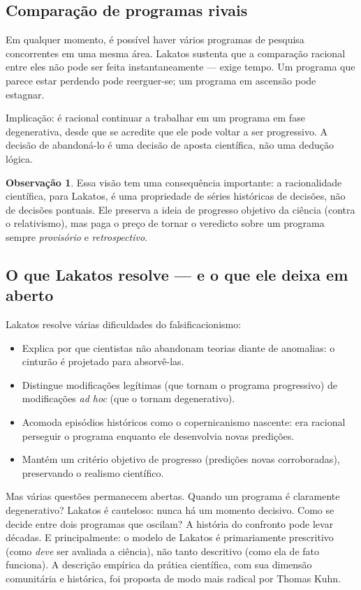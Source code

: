 \documentclass[9pt,a4paper]{extarticle}
\newcommand{\impt}[1]{\textcolor{important}{#1}}
\newcommand{\ntc}[1]{\textcolor{notice}{#1}}
\theoremstyle{definition}
\newtheorem{remark}{Observação}[section]
\begin{document}
\subsection{Comparação de programas rivais}

Em qualquer momento, é possível haver vários programas de pesquisa concorrentes em uma mesma área. Lakatos sustenta que a comparação racional entre eles \impt{não pode ser feita instantaneamente} --- exige tempo. Um programa que parece estar perdendo pode reerguer-se; um programa em ascensão pode estagnar.

\ntc{Implicação:} é \impt{racional} continuar a trabalhar em um programa em fase degenerativa, desde que se acredite que ele pode voltar a ser progressivo. A decisão de abandoná-lo é uma decisão de \impt{aposta científica}, não uma dedução lógica.

\begin{remark}
Essa visão tem uma consequência importante: a racionalidade científica, para Lakatos, é uma propriedade de \impt{séries históricas de decisões}, não de decisões pontuais. Ele preserva a ideia de progresso objetivo da ciência (contra o relativismo), mas paga o preço de tornar o veredicto sobre um programa sempre \emph{provisório} e \emph{retrospectivo}.
\end{remark}

\subsection{O que Lakatos resolve --- e o que ele deixa em aberto}

Lakatos resolve várias dificuldades do falsificacionismo:

\begin{itemize}
  \item Explica por que cientistas \impt{não abandonam} teorias diante de anomalias: o cinturão é projetado para absorvê-las.
  \item Distingue modificações legítimas (que tornam o programa progressivo) de modificações \emph{ad hoc} (que o tornam degenerativo).
  \item Acomoda episódios históricos como o copernicanismo nascente: era racional perseguir o programa enquanto ele desenvolvia novas predições.
  \item Mantém um critério \impt{objetivo} de progresso (predições novas corroboradas), preservando o realismo científico.
\end{itemize}

Mas várias questões permanecem abertas. \ntc{Quando} um programa é claramente degenerativo? Lakatos é cauteloso: nunca há um momento decisivo. \ntc{Como} se decide entre dois programas que oscilam? A história do confronto pode levar décadas. E principalmente: o modelo de Lakatos é primariamente \impt{prescritivo} (como \emph{deve} ser avaliada a ciência), não tanto \impt{descritivo} (como ela de fato funciona). A descrição empírica da prática científica, com sua dimensão comunitária e histórica, foi proposta de modo mais radical por Thomas Kuhn.
\end{document}
